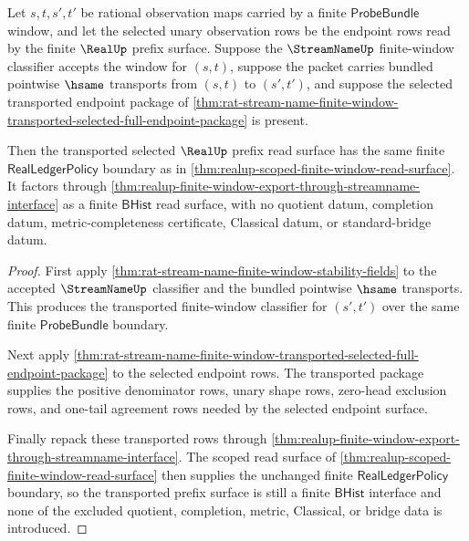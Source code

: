 \begin{theorem}
\label{thm:realup-streamname-window-stability-consumption}
Let $s,t,s',t'$ be rational observation maps carried by a finite
$\mathsf{ProbeBundle}$ window, and let the selected unary observation rows be
the endpoint rows read by the finite $\RealUp$ prefix surface. Suppose the
$\StreamNameUp$ finite-window classifier accepts the window for $(s,t)$,
suppose the packet carries bundled pointwise $\hsame$ transports from $(s,t)$
to $(s',t')$, and suppose the selected transported endpoint package of
\autoref{thm:rat-stream-name-finite-window-transported-selected-full-endpoint-package}
is present.

Then the transported selected $\RealUp$ prefix read surface has the same
finite $\mathsf{RealLedgerPolicy}$ boundary as in
\autoref{thm:realup-scoped-finite-window-read-surface}. It factors through
\autoref{thm:realup-finite-window-export-through-streamname-interface} as a
finite $\mathsf{BHist}$ read surface, with no quotient datum, completion datum,
metric-completeness certificate, Classical datum, or standard-bridge datum.
\end{theorem}
\begin{proof}
First apply
\autoref{thm:rat-stream-name-finite-window-stability-fields} to the accepted
$\StreamNameUp$ classifier and the bundled pointwise $\hsame$ transports. This
produces the transported finite-window classifier for $(s',t')$ over the same
finite $\mathsf{ProbeBundle}$ boundary.

Next apply
\autoref{thm:rat-stream-name-finite-window-transported-selected-full-endpoint-package}
to the selected endpoint rows. The transported package supplies the positive
denominator rows, unary shape rows, zero-head exclusion rows, and one-tail
agreement rows needed by the selected endpoint surface.

Finally repack these transported rows through
\autoref{thm:realup-finite-window-export-through-streamname-interface}. The
scoped read surface of \autoref{thm:realup-scoped-finite-window-read-surface}
then supplies the unchanged finite $\mathsf{RealLedgerPolicy}$ boundary, so
the transported prefix surface is still a finite $\mathsf{BHist}$ interface
and none of the excluded quotient, completion, metric, Classical, or bridge
data is introduced.
\end{proof}

